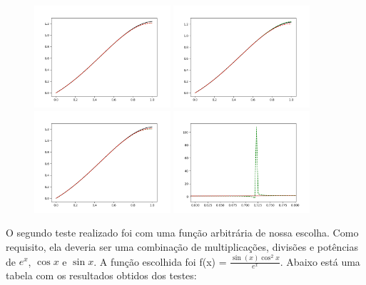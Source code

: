 \documentclass{article}
\begin{document}
    \begin{figure}[h]
        \centering
        \includegraphics[width=0.45\textwidth]{Figure_2.png}
        \includegraphics[width=0.45\textwidth]{Figure_3.png}\\
        \includegraphics[width=0.45\textwidth]{Figure_8.png}
        \includegraphics[width=0.45\textwidth]{Figure_1.png}\\
    \end{figure}

    O segundo teste realizado foi com uma função arbitrária de nossa escolha.
    Como requisito, ela deveria ser uma combinação de multiplicações, divisões
    e potências de $e^{x}$, $\cos{x}$ e $\sin{x}$.
    A função escolhida foi f(x) = $\frac{\sin(x)\cos^{2}{x}}{e^{x}}$.
    Abaixo está uma tabela com os resultados obtidos dos testes:
\end{document}
